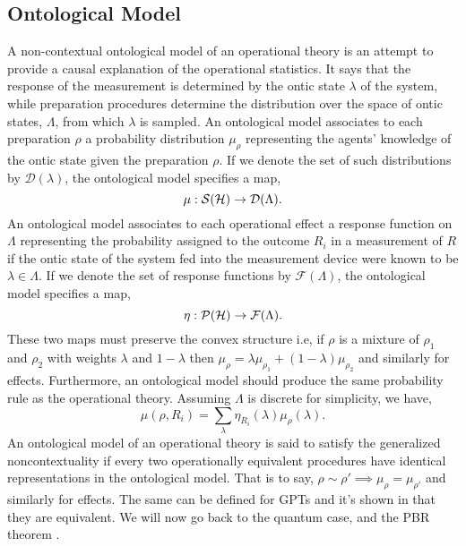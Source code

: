 \documentclass[11pt]{report}
\begin{document}
\subsection{Ontological Model}
A non-contextual ontological model of an operational theory is an attempt to provide a causal explanation of the operational statistics. It says that the response of the measurement is determined by the ontic state $\lambda$ of the system, while preparation procedures determine the distribution over the space of ontic states, $\Lambda$, from which $\lambda$ is sampled. An ontological model associates to each preparation $\rho$ a probability distribution $\mu_\rho$ representing the agents' knowledge of the ontic state given the preparation $\rho$. If we denote the set of such distributions by $\mathcal{D}(\lambda)$, the ontological model specifies a map, 
$$\mu:\mathcal{S}(\mathcal {H})\to\mathcal{D}(\Lambda).$$
An ontological model associates to each operational effect a response function on $\Lambda$ representing the probability assigned to the outcome $R_i$ in a measurement of $R$ if the ontic state of the system fed into the measurement device were known to be $\lambda\in \Lambda$. If we denote the set of response functions by $\mathcal{F}(\Lambda)$, the ontological model specifies a map, 
$$\eta:\mathcal{P}(\mathcal {H})\to \mathcal{F}(\Lambda).$$
These two maps must preserve the convex structure i.e, if $\rho$ is a mixture of $\rho_1$ and $\rho_2$ with weights $\lambda$ and $1-\lambda$ then $\mu_\rho=\lambda \mu_{\rho_1}+(1-\lambda)\mu_{\rho_2}$ and similarly for effects. Furthermore, an ontological model should produce the same probability rule as the operational theory. Assuming $\Lambda $ is discrete for simplicity, we have,
$$\mu(\rho, R_i)=\textstyle\sum_\lambda \eta_{R_i}(\lambda)\mu_\rho(\lambda).$$
An ontological model of an operational theory is said to satisfy the generalized noncontextuality if every two operationally equivalent procedures have identical representations in the ontological model. That is to say, $\rho\sim \rho' \implies \mu_\rho=\mu_{\rho'}$ and similarly for effects. The same can be defined for GPTs and it's shown in \cite{Schmid} that they are equivalent. We will now go back to the quantum case, and the PBR theorem \cite{Pusey}.
\end{document}

